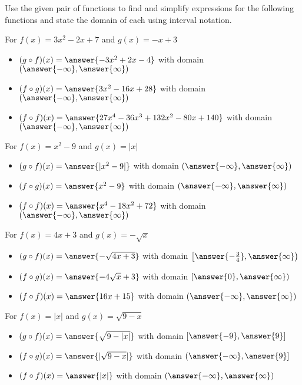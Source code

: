 \documentclass{ximera}
\author{Elizabeth Miller}
\begin{document}
Use the given pair of functions to find and simplify expressions for the following functions and state the domain of each using interval notation.

\begin{exercise}
For $f(x) = 3x^2 -2x+7$ and $g(x) = -x+3$ 
\begin{itemize}
\item  $(g \circ f)(x)=\answer{-3x^2+2x-4}$ with domain $\left(\answer{-\infty},\answer{\infty}\right)$
\item  $(f \circ g)(x)=\answer{3x^2-16x+28}$ with domain $\left(\answer{-\infty},\answer{\infty}\right)$
\item  $(f \circ f)(x)=\answer{27x^4-36x^3+132x^2-80x+140}$ with domain $\left(\answer{-\infty},\answer{\infty}\right)$
\end{itemize}
\end{exercise}


\begin{exercise}
For $f(x) = x^2-9$ and $g(x) = |x|$ 
\begin{itemize}
\item  $(g \circ f)(x)=\answer{|x^2-9|}$ with domain $\left(\answer{-\infty},\answer{\infty}\right)$
\item  $(f \circ g)(x)=\answer{x^2-9}$ with domain $\left(\answer{-\infty},\answer{\infty}\right)$
\item  $(f \circ f)(x)=\answer{x^4-18x^2+72}$ with domain $\left(\answer{-\infty},\answer{\infty}\right)$
\end{itemize}
\end{exercise}


\begin{exercise}
For $f(x) = 4x+3$ and $g(x) = -\sqrt{x}$ 
\begin{itemize}
\item  $(g \circ f)(x)=\answer{ -\sqrt{4x+3}}$ with domain $\left[\answer{-\frac{3}{4}},\answer{\infty}\right)$
\item  $(f \circ g)(x)=\answer{-4\sqrt{x}+3}$ with domain $\left[\answer{0},\answer{\infty}\right)$
\item  $(f \circ f)(x)=\answer{16x+ 15}$ with domain $\left(\answer{-\infty},\answer{\infty}\right)$
\end{itemize}
\end{exercise}




\begin{exercise}
For   $f(x) = |x|$ and $g(x) = \sqrt{9-x}$
\begin{itemize}
\item  $(g \circ f)(x)=\answer{\sqrt{9-|x|}}$ with domain $\left[\answer{-9},\answer{9}\right]$
\item  $(f \circ g)(x)=\answer{|\sqrt{9-x}|}$ with domain $\left(\answer{-\infty},\answer{9}\right]$
\item  $(f \circ f)(x)=\answer{|x|}$ with domain $\left(\answer{-\infty},\answer{\infty}\right)$
\end{itemize}
\end{exercise}
\end{document}
